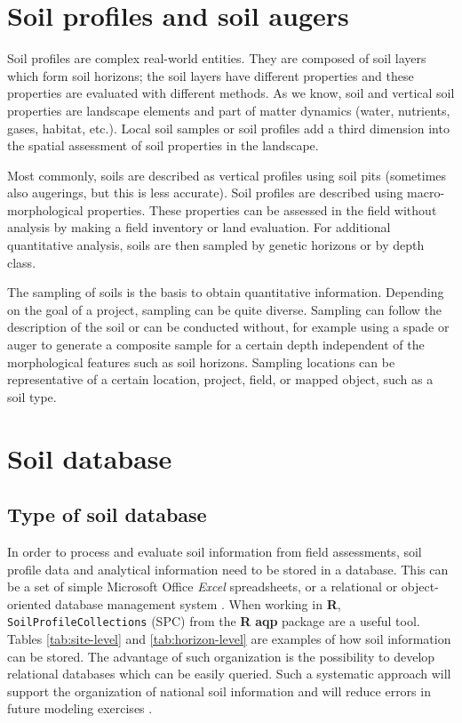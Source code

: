 \documentclass[10pt,b5paper,]{book}
\theoremstyle{definition}
\theoremstyle{definition}
\theoremstyle{definition}
\theoremstyle{remark}
\begin{document}
\hypertarget{soil-profiles-and-soil-augers}{%
\section{Soil profiles and soil
augers}\label{soil-profiles-and-soil-augers}}

Soil profiles are complex real-world entities. They are composed of soil
layers which form soil horizons; the soil layers have different
properties and these properties are evaluated with different methods. As
we know, soil and vertical soil properties are landscape elements and
part of matter dynamics (water, nutrients, gases, habitat, etc.). Local
soil samples or soil profiles add a third dimension into the spatial
assessment of soil properties in the landscape.

Most commonly, soils are described as vertical profiles using soil pits
(sometimes also augerings, but this is less accurate). Soil profiles are
described using macro-morphological properties. These properties can be
assessed in the field without analysis by making a field inventory or
land evaluation. For additional quantitative analysis, soils are then
sampled by genetic horizons or by depth class.

The sampling of soils is the basis to obtain quantitative information.
Depending on the goal of a project, sampling can be quite diverse.
Sampling can follow the description of the soil or can be conducted
without, for example using a spade or auger to generate a composite
sample for a certain depth independent of the morphological features
such as soil horizons. Sampling locations can be representative of a
certain location, project, field, or mapped object, such as a soil type.

\hypertarget{soil-database}{%
\section{Soil database}\label{soil-database}}

\hypertarget{type-of-soil-database}{%
\subsection{Type of soil database}\label{type-of-soil-database}}

In order to process and evaluate soil information from field
assessments, soil profile data and analytical information need to be
stored in a database. This can be a set of simple Microsoft Office
\emph{Excel} spreadsheets, or a relational or object-oriented database
management system \citep{baritz2008environmental}. When working in
\textbf{R}, \texttt{SoilProfileCollections} (SPC) from the \textbf{R}
\textbf{aqp} package are a useful tool. Tables \ref{tab:site-level} and
\ref{tab:horizon-level} are examples of how soil information can be
stored. The advantage of such organization is the possibility to develop
relational databases which can be easily queried. Such a systematic
approach will support the organization of national soil information and
will reduce errors in future modeling exercises
\citep{baritz2008environmental}.
\end{document}
